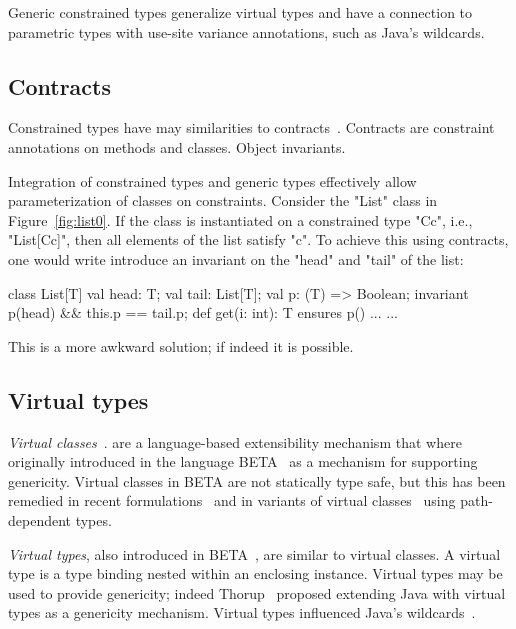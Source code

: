 Generic constrained types generalize virtual types and 
have a connection to parametric types with use-site variance
annotations, such as Java's wildcards.  

\subsection{Contracts}

Constrained types have may similarities to contracts~\cite{xxx}.
Contracts are constraint annotations on methods and classes.
Object invariants.

Integration of constrained types and generic types 
effectively allow parameterization of classes on constraints.
Consider the \xcd"List" class in Figure~\ref{fig:list0}.
If the class is instantiated on a constrained type \xcd"C{c}",
i.e., \xcd"List[C{c}]",
then all elements of the list satisfy \xcd"c".  To achieve this
using contracts, one would write introduce an invariant on the
\xcd"head" and \xcd"tail" of the list:
{
\begin{xten}
class List[T] {
  val head: T;
  val tail: List[T];
  val p: (T) => Boolean;
  invariant p(head) && this.p == tail.p;
  def get(i: int): T ensures p(\return)
    { ... }
  ...
}
\end{xten}}
\noindent
This is a more awkward solution; if indeed it is possible.

\subsection{Virtual types}

\emph{Virtual classes}~\cite{beta,mp89-virtual-classes,ernst06-virtual}.
are a language-based extensibility
mechanism that where
originally introduced in the language
BETA~\cite{beta} as a mechanism
for supporting genericity.
Virtual classes in BETA are not statically type safe, but this has been
remedied in recent formulations~\cite{ernst99-gbeta,ernst06-virtual} and in
variants of 
virtual classes~\cite{scala,nqm06,cdnw07-tribe,variant-path-types}
using path-dependent types.  

\emph{Virtual types}, also introduced in BETA~\cite{beta},
are similar to virtual
classes.  A virtual type is a type binding nested within an
enclosing instance.
Virtual types
may be used to provide genericity; indeed
Thorup~\cite{thorup97} proposed extending Java with virtual types
as a genericity mechanism.  Virtual types influenced Java's 
wildcards~\cite{adding-wildcards,Java3,wildcards-safe}.


